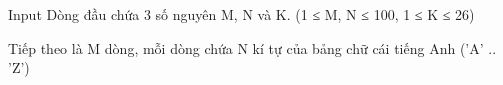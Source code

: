 Input
Dòng đầu chứa 3 số nguyên M, N và K. (1 ≤ M, N ≤ 100, 1 ≤ K ≤ 26)  

   Tiếp theo là M dòng, mỗi dòng chứa N kí tự của bảng chữ cái tiếng Anh ('A' .. 'Z')